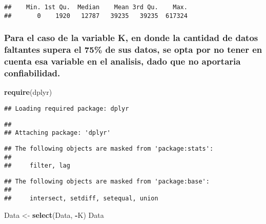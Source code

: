 \documentclass[]{article}
\newenvironment{Shaded}{\begin{snugshade}}{\end{snugshade}}
\newcommand{\KeywordTok}[1]{\textcolor[rgb]{0.13,0.29,0.53}{\textbf{#1}}}
\newcommand{\NormalTok}[1]{#1}
\newcommand{\OperatorTok}[1]{\textcolor[rgb]{0.81,0.36,0.00}{\textbf{#1}}}
\newcommand{\StringTok}[1]{\textcolor[rgb]{0.31,0.60,0.02}{#1}}
\begin{document}
\begin{verbatim}
##    Min. 1st Qu.  Median    Mean 3rd Qu.    Max. 
##       0    1920   12787   39235   39235  617324
\end{verbatim}

\hypertarget{para-el-caso-de-la-variable-k-en-donde-la-cantidad-de-datos-faltantes-supera-el-75-de-sus-datos-se-opta-por-no-tener-en-cuenta-esa-variable-en-el-analisis-dado-que-no-aportaria-confiabilidad.}{%
\subsubsection{Para el caso de la variable K, en donde la cantidad de
datos faltantes supera el 75\% de sus datos, se opta por no tener en
cuenta esa variable en el analisis, dado que no aportaria
confiabilidad.}\label{para-el-caso-de-la-variable-k-en-donde-la-cantidad-de-datos-faltantes-supera-el-75-de-sus-datos-se-opta-por-no-tener-en-cuenta-esa-variable-en-el-analisis-dado-que-no-aportaria-confiabilidad.}}

\begin{Shaded}
\begin{Highlighting}[]
\KeywordTok{require}\NormalTok{(dplyr)}
\end{Highlighting}
\end{Shaded}

\begin{verbatim}
## Loading required package: dplyr
\end{verbatim}

\begin{verbatim}
## 
## Attaching package: 'dplyr'
\end{verbatim}

\begin{verbatim}
## The following objects are masked from 'package:stats':
## 
##     filter, lag
\end{verbatim}

\begin{verbatim}
## The following objects are masked from 'package:base':
## 
##     intersect, setdiff, setequal, union
\end{verbatim}

\begin{Shaded}
\begin{Highlighting}[]
\NormalTok{Data <-}\StringTok{ }\KeywordTok{select}\NormalTok{(Data, }\OperatorTok{-}\NormalTok{K)}
\NormalTok{Data}
\end{Highlighting}
\end{Shaded}
\end{document}
